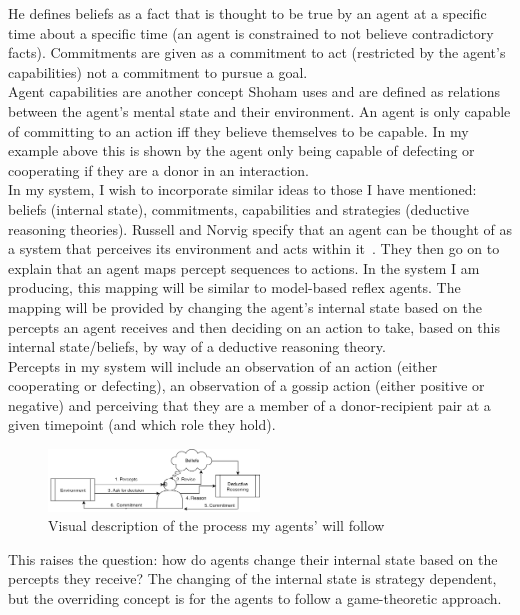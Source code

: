 \documentclass[twoside,twocolumn]{article}
\begin{document}
He defines beliefs as a fact that is thought to be true by an agent at a specific time about a specific time (an agent is constrained to not believe contradictory facts). Commitments are given as a commitment to act (restricted by the agent's capabilities) not a commitment to pursue a goal.\\
Agent capabilities are another concept Shoham uses and are defined as relations between the agent's mental state and their environment. An agent is only capable of committing to an action iff they believe themselves to be capable. In my example above this is shown by the agent only being capable of defecting or cooperating if they are a donor in an interaction.\\
In my system, I wish to incorporate similar ideas to those I have mentioned: beliefs (internal state), commitments, capabilities and strategies (deductive reasoning theories). Russell and Norvig specify that an agent can be thought of as a system that perceives its environment and acts within it~\cite{russell2016artificial}. They then go on to explain that an agent maps percept sequences to actions. In the system I am producing, this mapping will be similar to model-based reflex agents. The mapping will be provided by changing the agent's internal state based on the percepts an agent receives and then deciding on an action to take, based on this internal state/beliefs, by way of a deductive reasoning theory.\\
Percepts in my system will include an observation of an action (either cooperating or defecting), an observation of a gossip action (either positive or negative) and perceiving that they are a member of a donor-recipient pair at a given timepoint (and which role they hold).
\begin{figure}
	\begin{center}
	\includegraphics[width=0.5\textwidth]{PerceiveReviseDecide.png}
	\caption{Visual description of the process my agents' will follow}
	\label{fig:percept_to_action}
	\end{center}
\end{figure}
\noindent This raises the question: how do agents change their internal state based on the percepts they receive? The changing of the internal state is strategy dependent, but the overriding concept is for the agents to follow a game-theoretic approach.\\
\end{document}
